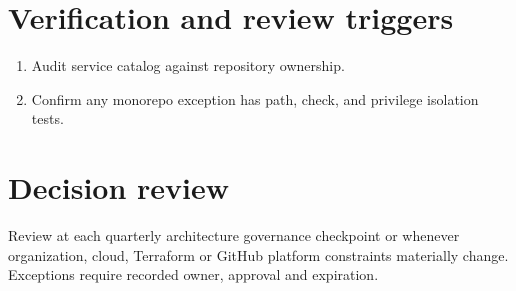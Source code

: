\documentclass[11pt]{article}
\begin{document}
\section*{Verification and review triggers}
\begin{enumerate}[leftmargin=*]
\item Audit service catalog against repository ownership.
\item Confirm any monorepo exception has path, check, and privilege isolation tests.
\end{enumerate}
\section*{Decision review}
Review at each quarterly architecture governance checkpoint or whenever organization, cloud, Terraform or GitHub platform constraints materially change. Exceptions require recorded owner, approval and expiration.
\end{document}
